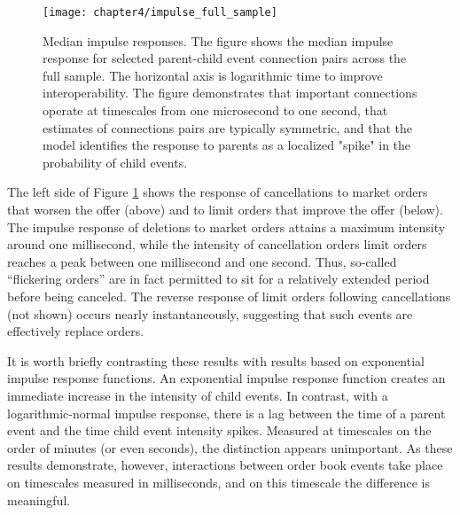 		\begin{figure}[p]
			\small
			\linespread{1}
			\centering
			\texttt{[image: chapter4/impulse\_full\_sample]}
			\captionsetup{skip=-20pt, position=below, font=footnotesize, justification=justified, width=\linewidth}
			\caption[Median impulse responses]{Median impulse responses. The figure shows the median impulse response for selected parent-child event connection pairs across the full sample. The horizontal axis is logarithmic time to improve interoperability. The figure demonstrates that important connections operate at timescales from one microsecond to one second, that estimates of connections pairs are typically symmetric, and that the model identifies the response to parents as a localized "spike" in the probability of child events.}
			\label{fig:impulse_full_sample}
		\end{figure}

		The left side of Figure \ref{fig:impulse_full_sample} shows the response of cancellations to market orders that worsen the offer (above) and to limit orders that improve the offer (below). The impulse response of deletions to market orders attains a maximum intensity around one millisecond, while the intensity of cancellation orders limit orders reaches a peak between one millisecond and one second. Thus, so-called ``flickering orders'' are in fact permitted to sit for a relatively extended period before being canceled. The reverse response of limit orders following cancellations (not shown) occurs nearly instantaneously, suggesting that such events are effectively replace orders.

		It is worth briefly contrasting these results with results based on exponential impulse response functions. An exponential impulse response function creates an immediate increase in the intensity of child events. In contrast, with a logarithmic-normal impulse response, there is a lag between the time of a parent event and the time child event intensity spikes. Measured at timescales on the order of minutes (or even seconds), the distinction appears unimportant. As these results demonstrate, however, interactions between order book events take place on timescales measured in milliseconds, and on this timescale the difference is meaningful.

